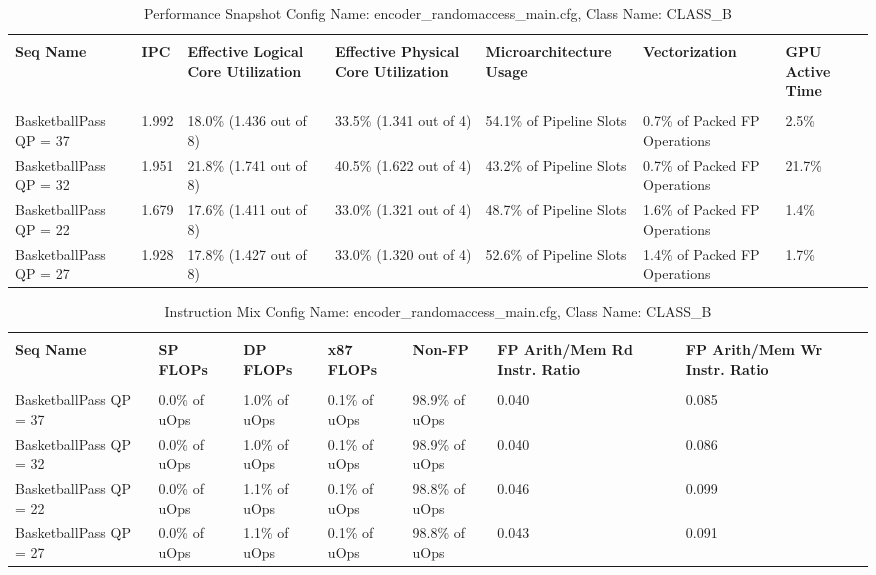 \documentclass{article}%
\begin{document}
\begin{longtabu}{| X[l] | X[l] | X[l] | X[l] | X[l] | X[l] | X[l] |}%
\caption{%
Performance Snapshot\newline%
 Config Name: encoder\_randomaccess\_main.cfg,\newline%
 Class Name: CLASS\_B\newline%
%
}%
\hline%
&&&&&&\\%
\textbf{Seq Name}&\textbf{IPC}&\textbf{Effective Logical Core Utilization}&\textbf{Effective Physical Core Utilization}&\textbf{Microarchitecture Usage}&\textbf{Vectorization}&\textbf{GPU Active Time}\\%
&&&&&&\\%
\hline%
\endhead%
BasketballPass\newline%
 QP = 37&1.992&18.0\% (1.436 out of 8)&33.5\% (1.341 out of 4)&54.1\% of Pipeline Slots&0.7\% of Packed FP Operations&2.5\%\\%
\hline%
BasketballPass\newline%
 QP = 32&1.951&21.8\% (1.741 out of 8)&40.5\% (1.622 out of 4)&43.2\% of Pipeline Slots&0.7\% of Packed FP Operations&21.7\%\\%
\hline%
BasketballPass\newline%
 QP = 22&1.679&17.6\% (1.411 out of 8)&33.0\% (1.321 out of 4)&48.7\% of Pipeline Slots&1.6\% of Packed FP Operations&1.4\%\\%
\hline%
BasketballPass\newline%
 QP = 27&1.928&17.8\% (1.427 out of 8)&33.0\% (1.320 out of 4)&52.6\% of Pipeline Slots&1.4\% of Packed FP Operations&1.7\%\\%
\hline%
\end{longtabu}%
\begin{longtabu}{| X[l] | X[l] | X[l] | X[l] | X[l] | X[l] | X[l] |}%
\caption{%
Instruction Mix\newline%
 Config Name: encoder\_randomaccess\_main.cfg,\newline%
 Class Name: CLASS\_B\newline%
%
}%
\hline%
&&&&&&\\%
\textbf{Seq Name}&\textbf{SP FLOPs}&\textbf{DP FLOPs}&\textbf{x87 FLOPs}&\textbf{Non{-}FP}&\textbf{FP Arith/Mem Rd Instr. Ratio}&\textbf{FP Arith/Mem Wr Instr. Ratio}\\%
&&&&&&\\%
\hline%
\endhead%
BasketballPass\newline%
 QP = 37&0.0\% of uOps&1.0\% of uOps&0.1\% of uOps&98.9\% of uOps&0.040&0.085\\%
\hline%
BasketballPass\newline%
 QP = 32&0.0\% of uOps&1.0\% of uOps&0.1\% of uOps&98.9\% of uOps&0.040&0.086\\%
\hline%
BasketballPass\newline%
 QP = 22&0.0\% of uOps&1.1\% of uOps&0.1\% of uOps&98.8\% of uOps&0.046&0.099\\%
\hline%
BasketballPass\newline%
 QP = 27&0.0\% of uOps&1.1\% of uOps&0.1\% of uOps&98.8\% of uOps&0.043&0.091\\%
\hline%
\end{longtabu}%
\end{document}
